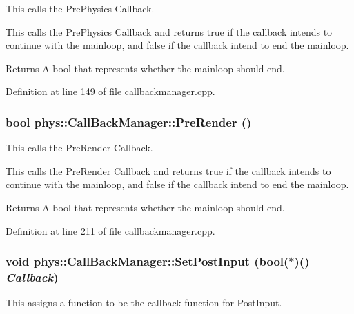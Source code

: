 This calls the PrePhysics Callback. 

This calls the PrePhysics Callback and returns true if the callback intends to continue with the mainloop, and false if the callback intend to end the mainloop. \begin{DoxyReturn}{Returns}
A bool that represents whether the mainloop should end. 
\end{DoxyReturn}


Definition at line 149 of file callbackmanager.cpp.

\hypertarget{classphys_1_1CallBackManager_a244c88b8a06f68a4f4bcff6253bf6806}{
\subsubsection[{PreRender}]{\setlength{\rightskip}{0pt plus 5cm}bool phys::CallBackManager::PreRender ()}}
\label{d1/d47/classphys_1_1CallBackManager_a244c88b8a06f68a4f4bcff6253bf6806}


This calls the PreRender Callback. 

This calls the PreRender Callback and returns true if the callback intends to continue with the mainloop, and false if the callback intend to end the mainloop. \begin{DoxyReturn}{Returns}
A bool that represents whether the mainloop should end. 
\end{DoxyReturn}


Definition at line 211 of file callbackmanager.cpp.

\hypertarget{classphys_1_1CallBackManager_abbf73a7199a64d6a2a39c7de44c5acd6}{
\subsubsection[{SetPostInput}]{\setlength{\rightskip}{0pt plus 5cm}void phys::CallBackManager::SetPostInput (bool($\ast$)() {\em Callback})}}
\label{d1/d47/classphys_1_1CallBackManager_abbf73a7199a64d6a2a39c7de44c5acd6}


This assigns a function to be the callback function for PostInput. 

